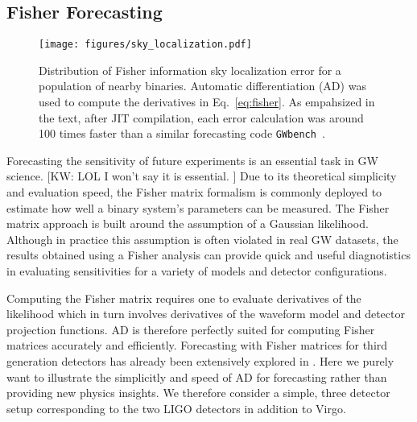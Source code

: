 \documentclass[twocolumn]{aastex631}
\newcommand{\kw}[1]{{\color{rb4}[KW: #1 ]}}
\begin{document}
\subsection{Fisher Forecasting}
\label{subsec:fisher}

\begin{figure}[t!]
    \centering
    \texttt{[image: figures/sky\_localization.pdf]}
    \caption{
        Distribution of Fisher information sky localization error for a population of nearby binaries.
        Automatic differentiation (AD) was used to compute the derivatives in Eq.~\ref{eq:fisher}.
        As empahsized in the text, after JIT compilation, each error calculation was around 100 times faster than a similar forecasting code \texttt{GWbench}~\citep{Borhanian:2020ypi}.
    }
    \label{fig:sky_localization}
\end{figure}

Forecasting the sensitivity of future experiments is an essential task in GW science. \kw{LOL I won't say it is essential.}
Due to its theoretical simplicity and evaluation speed, the Fisher matrix formalism is commonly deployed to estimate how well a binary system's parameters can be measured.
The Fisher matrix approach is built around the assumption of a Gaussian likelihood.
Although in practice this assumption is often violated in real GW datasets, the results obtained using a Fisher analysis can provide quick and useful diagnotistics in evaluating sensitivities for a variety of models and detector configurations.

Computing the Fisher matrix requires one to evaluate derivatives of the likelihood which in turn involves derivatives of the waveform model and detector projection functions.
AD is therefore perfectly suited for computing Fisher matrices accurately and efficiently. 
Forecasting with Fisher matrices for third generation detectors has already been extensively explored in \citep{Iacovelli:2022bbs, Iacovelli:2022mbg}.
Here we purely want to illustrate the simplicitly and speed of AD for forecasting rather than providing new physics insights.
We therefore consider a simple, three detector setup corresponding to the two LIGO detectors in addition to Virgo.
\end{document}

